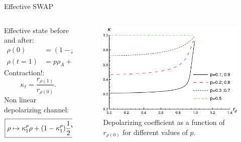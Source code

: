 \begin{frame}{Effective SWAP}
    \begin{columns}
        \begin{column}{0.5\textwidth}
            Effective state before and after:
            \begin{align*}
                \rho(0)&=(1-p)\rho_{A}+p\rho_{B},\\
                \rho(t=1)&=p\rho_{A}+(1-p)\rho_{B}.
                \end{align*}
                Contraction!:
                \begin{equation*}
                    \kappa_{t}=\frac{r_{\rho(1)}}{r_{\rho(0)}}.
                  \end{equation*}
                  Non linear depolarizing channel:
                  \begin{equation*}
                      \boxed{\rho\mapsto\kappa_{1}^{\rho}\rho+(1-\kappa_{1}^{\rho})\frac{1}{2}\Id}
                    \end{equation*}
        \end{column}
        \begin{column}{0.5\textwidth}
            \begin{figure}[h!]
                \centering
                \includegraphics[width=0.9\linewidth]{figures/ContractionFactorSWAP_2D_r0to1_legend.png}
                \caption{Depolarizing coefficient as a function of $r_{\rho(0)}$ for different values of $p$.}
                \label{fig:SWAPFactor2D}
              \end{figure}
        \end{column}
    \end{columns}
\end{frame}


